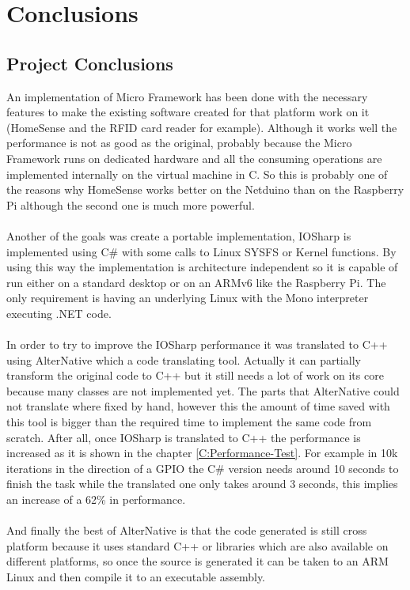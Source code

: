 \chapter{Conclusions}\label{C:Conclusions}
\section{Project Conclusions}\label{S:Project-Conclusions}
An implementation of Micro Framework has been done with the necessary features to make the existing software created for that platform work on it (HomeSense and the RFID card reader for example). Although it works well the performance is not as good as the original, probably because the Micro Framework runs on dedicated hardware and all the consuming operations are implemented internally on the virtual machine in C. So this is probably one of the reasons why HomeSense works better on the Netduino than on the Raspberry Pi although the second one is much more powerful.
\\
\\
Another of the goals was create a portable implementation, IOSharp is implemented using C\# with some calls to Linux SYSFS or Kernel functions. By using this way the implementation is architecture independent so it is capable of run either on a standard desktop or on an ARMv6 like the Raspberry Pi. The only requirement is having an underlying Linux with the Mono interpreter executing .NET code.
\\
\\
In order to try to improve the IOSharp performance it was translated to C++ using AlterNative which a code translating tool. Actually it can partially transform the original code to C++ but it still needs a lot of work on its core because many classes are not implemented yet. The parts that AlterNative could not translate where fixed by hand, however this the amount of time saved with this tool is bigger than the required time to implement the same code from scratch. After all, once IOSharp is translated to C++ the performance is increased as it is shown in the chapter \ref{C:Performance-Test}. For example in 10k iterations in the direction of a GPIO the C\# version needs around 10 seconds to finish the task while the translated one only takes around 3 seconds, this implies an increase of a 62\% in performance.
\\
\\
And finally the best of AlterNative is that the code generated is still cross platform because it uses standard C++ or libraries which are also available on different platforms, so once the source is generated it can be taken to an ARM Linux and then compile it to an executable assembly.

